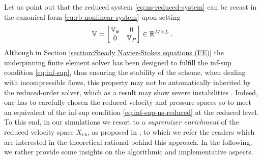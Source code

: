 \documentclass[12pt, a4paper, twoside, openright, notitlepage]{report}
\numberwithin{equation}{chapter}
\theoremstyle{theorem}
\theoremstyle{definition}
\theoremstyle{remark}
\theoremstyle{proposition}
\numberwithin{figure}{chapter}
\newcommand{\bg}[1]{\boldsymbol{#1}}
\begin{document}
		Let us point out that the reduced system \eqref{eq:ns-reduced-system} can be recast in the canonical form \eqref{eq:rb-nonlinear-system} upon setting
		\begin{equation*}
			\mathbb{V} = 
			\begin{bmatrix}
			\hspace*{-0.15cm}
			\begin{array}{cc}
				\mathbb{V}_{\bg{v}} & 0 \\
				0 & \mathbb{V}_P
			\end{array} 
			\hspace*{-0.15cm}
			\end{bmatrix} 
			\in \mathbb{R}^{M \times L} \, .
		\end{equation*}
		Although in Section \ref{section:Steady Navier-Stokes equations (FE)} the underpinning finite element solver has been designed to fulfill the inf-sup condition \eqref{eq:inf-sup}, thus ensuring the stability of the scheme, when dealing with incompressible flows, this property may not be automatically inherited by the reduced-order solver, which as a result may show severe instabilities \cite{Bur06}. Indeed, one has to carefully chosen the reduced velocity and pressure spaces so to meet an equivalent of the inf-sup condition \eqref{eq:inf-sup-ns-reduced} at the reduced level. To this end, in our simulations we resort to a \emph{supremizer enrichment} of the reduced velocity space $X_{\texttt{rb}}$, as proposed in \cite{Bal14}, to which we refer the readers which are interested in the theoretical rational behind this approach. In the following, we rather provide some insights on the algorithmic and implementative aspects.
		
\end{document}
